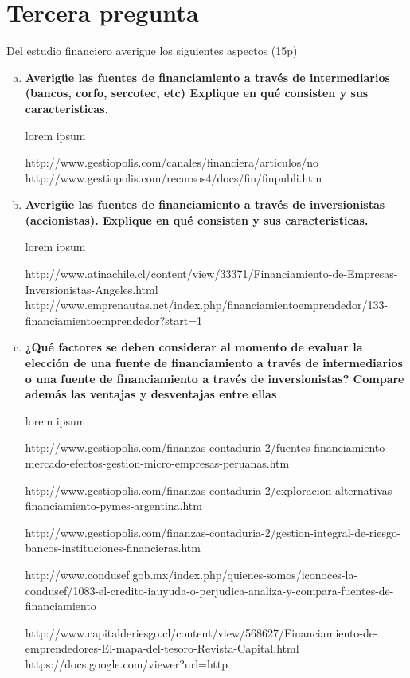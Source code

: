 \section{Tercera pregunta}

Del estudio financiero averigue los siguientes aspectos (15p)

\begin{enumerate}[(a)]
    \item {\bf Averigüe las fuentes de financiamiento a través de intermediarios
          (bancos, corfo, sercotec, etc) Explique en qué consisten y sus caracteristicas.}\\


          lorem ipsum

        http://www.gestiopolis.com/canales/financiera/articulos/no%
        http://www.gestiopolis.com/recursos4/docs/fin/finpubli.htm

    \item {\bf Averigüe las fuentes de financiamiento a través de inversionistas (accionistas).
          Explique en qué consisten y sus caracteristicas.}\\


          lorem ipsum

            http://www.atinachile.cl/content/view/33371/Financiamiento-de-Empresas-Inversionistas-Angeles.html
            http://www.emprenautas.net/index.php/financiamientoemprendedor/133-financiamientoemprendedor?start=1


    \item {\bf ¿Qué factores se deben considerar al momento de evaluar la elección de una
          fuente de financiamiento a través de intermediarios o una fuente de financiamiento
          a través de inversionistas? Compare además las ventajas y desventajas entre ellas}\\


          lorem ipsum

        http://www.gestiopolis.com/finanzas-contaduria-2/fuentes-financiamiento-mercado-efectos-gestion-micro-empresas-peruanas.htm

        http://www.gestiopolis.com/finanzas-contaduria-2/exploracion-alternativas-financiamiento-pymes-argentina.htm

        http://www.gestiopolis.com/finanzas-contaduria-2/gestion-integral-de-riesgo-bancos-instituciones-financieras.htm

        http://www.condusef.gob.mx/index.php/quienes-somos/iconoces-la-condusef/1083-el-credito-iauyuda-o-perjudica-analiza-y-compara-fuentes-de-financiamiento

        

        http://www.capitalderiesgo.cl/content/view/568627/Financiamiento-de-emprendedores-El-mapa-del-tesoro-Revista-Capital.html
https://docs.google.com/viewer?url=http%

\end{enumerate}
